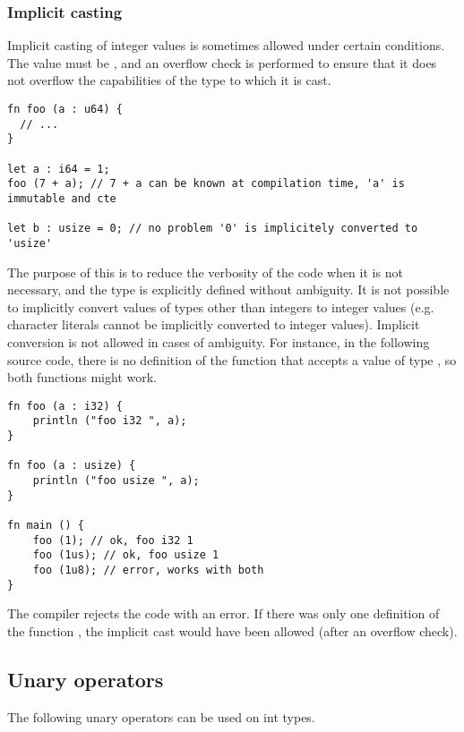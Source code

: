 \subsubsection{Implicit casting}

Implicit casting of integer values is sometimes allowed under certain
conditions. The value must be , and an overflow check is performed
to ensure that it does not overflow the capabilities of the type to which it is
cast.

  \begin{lstlisting}[style=coloredverbatim]
fn foo (a : u64) {
  // ...
}

let a : i64 = 1;
foo (7 + a); // 7 + a can be known at compilation time, 'a' is immutable and cte

let b : usize = 0; // no problem '0' is implicitely converted to 'usize'
  \end{lstlisting}

The purpose of this is to reduce the verbosity of the code when it is not
necessary, and the type is explicitly defined without ambiguity. It is not
possible to implicitly convert values of types other than integers to integer
values (e.g. character literals cannot be implicitly converted to integer
values). Implicit conversion is not allowed in cases of ambiguity. For instance,
in the following source code, there is no definition of the function
 that accepts a value of type , so both functions might
work.

\begin{lstlisting}[style=coloredverbatim]
fn foo (a : i32) {
    println ("foo i32 ", a);
}

fn foo (a : usize) {
    println ("foo usize ", a);
}

fn main () {
    foo (1); // ok, foo i32 1
    foo (1us); // ok, foo usize 1
    foo (1u8); // error, works with both
}
  \end{lstlisting}

The compiler rejects the code with an error. If there was only one definition of
the function , the implicit cast would have been allowed (after an
overflow check).

\subsection{Unary operators}
\label{sec:orge691bb5}

The following unary operators can be used on int types.
\smallskip


